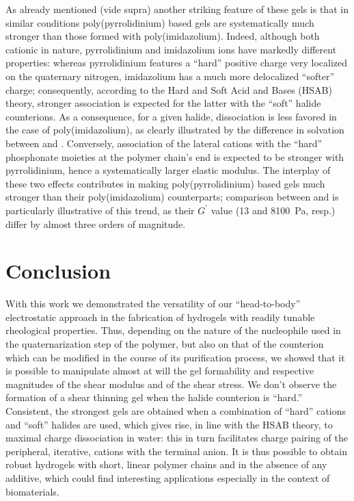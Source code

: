 \documentclass[journal=jacsat,manuscript=article]{achemso}
\begin{document}
As already mentioned (vide supra) another striking feature of these gels is that in similar conditions poly(pyrrolidinium) based gels are systematically much stronger than those formed with poly(imidazolium). Indeed, although both cationic in nature, pyrrolidinium and imidazolium ions have markedly different properties: whereas pyrrolidinium features a ``hard'' positive charge very localized on the quaternary nitrogen, imidazolium has a much more delocalized ``softer'' charge; consequently, according to the Hard and Soft Acid and Bases (HSAB) theory, stronger association is expected for the latter with the ``soft'' halide counterions.\cite{Goossens2009} As a consequence, for a given halide, dissociation is less favored in the case of poly(imidazolium), as clearly illustrated by the difference in solvation between  and . Conversely, association of the lateral cations with the ``hard'' phosphonate moieties at the polymer chain’s end is expected to be stronger with pyrrolidinium, hence a systematically larger elastic modulus. The interplay of these two effects contributes in making poly(pyrrolidinium) based gels much stronger than their poly(imidazolium) counterparts; comparison between  and  is particularly illustrative of this trend, as their $G^\prime$ value (13 and \SI{8100}{\pascal}, resp.) differ by almost three orders of magnitude.

\section{Conclusion}
With this work we demonstrated the versatility of our ``head-to-body'' electrostatic approach in the fabrication of hydrogels with readily tunable rheological properties. Thus, depending on the nature of the nucleophile used in the quaternarization step of the polymer, but also on that of the counterion which can be modified in the course of its purification process, we showed that it is possible to manipulate almost at will the gel formability and respective magnitudes of the shear modulus and of the shear stress. We don’t observe the formation of a shear thinning gel when the halide counterion is ``hard.'' Consistent, the strongest gels are obtained when a combination of ``hard'' cations and ``soft'' halides are used, which gives rise, in line with the HSAB theory, to maximal charge dissociation in water: this in turn facilitates charge pairing of the peripheral, iterative, cations with the terminal anion. It is thus possible to obtain robust hydrogels with short, linear polymer chains and in the absence of any additive, which could find interesting applications especially in the context of biomaterials.
\end{document}
